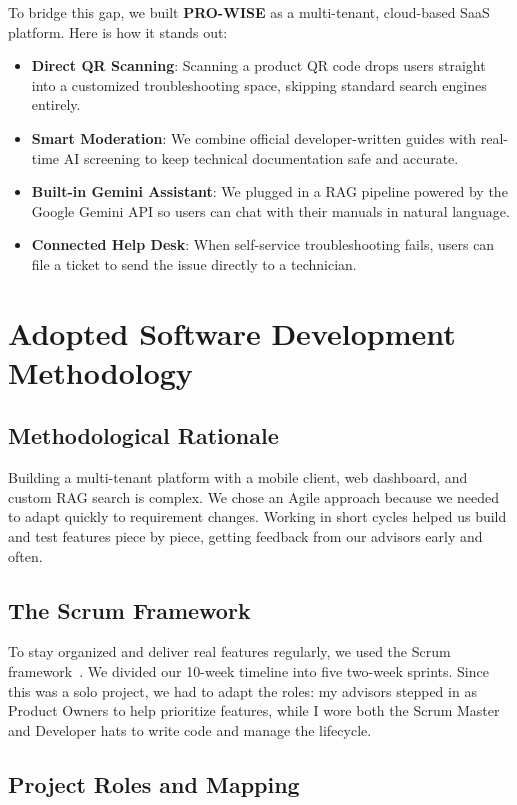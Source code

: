 \documentclass[12pt,a4paper]{report}
\begin{document}
To bridge this gap, we built \textbf{PRO-WISE} as a multi-tenant, cloud-based SaaS platform. Here is how it stands out:
\begin{itemize}
    \item \textbf{Direct QR Scanning}: Scanning a product QR code drops users straight into a customized troubleshooting space, skipping standard search engines entirely.
    \item \textbf{Smart Moderation}: We combine official developer-written guides with real-time AI screening to keep technical documentation safe and accurate.
    \item \textbf{Built-in Gemini Assistant}: We plugged in a RAG pipeline powered by the Google Gemini API so users can chat with their manuals in natural language.
    \item \textbf{Connected Help Desk}: When self-service troubleshooting fails, users can file a ticket to send the issue directly to a technician.
\end{itemize}

\section{Adopted Software Development Methodology}

\subsection{Methodological Rationale}

Building a multi-tenant platform with a mobile client, web dashboard, and custom RAG search is complex. We chose an Agile approach because we needed to adapt quickly to requirement changes. Working in short cycles helped us build and test features piece by piece, getting feedback from our advisors early and often.

\subsection{The Scrum Framework}

To stay organized and deliver real features regularly, we used the Scrum framework~\cite{scrumguide}. We divided our 10-week timeline into five two-week sprints. Since this was a solo project, we had to adapt the roles: my advisors stepped in as Product Owners to help prioritize features, while I wore both the Scrum Master and Developer hats to write code and manage the lifecycle.

\subsection{Project Roles and Mapping}
\end{document}
